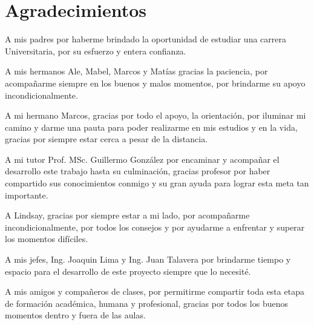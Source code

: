 \newpage

\chapter*{\centering Agradecimientos}

A mis padres por haberme brindado la oportunidad de estudiar una carrera Universitaria, por su esfuerzo y entera confianza.

A mis hermanos Ale, Mabel, Marcos y Matías gracias la paciencia, por acompañarme siempre en los buenos y malos momentos, por brindarme su apoyo incondicionalmente.

A mi hermano Marcos, gracias por todo el apoyo, la orientación, por iluminar mi camino y darme una pauta para poder realizarme en mis estudios y en la vida, gracias por siempre estar cerca a pesar de la distancia.

A mi tutor Prof. MSc. Guillermo González por encaminar y acompañar el desarrollo este trabajo hasta su culminación, gracias profesor por haber compartido sus conocimientos conmigo y su gran ayuda para lograr esta meta tan importante.

A Lindsay, gracias por siempre estar a mi lado, por acompañarme incondicionalmente, por todos los consejos y por ayudarme a enfrentar y superar los momentos difíciles.

A mis jefes, Ing. Joaquin Lima y Ing. Juan Talavera por brindarme tiempo y espacio para el desarrollo de este proyecto siempre que lo necesité.

A mis amigos y compañeros de clases, por permitirme compartir toda esta etapa de formación académica, humana y profesional, gracias por todos los buenos momentos dentro y fuera de las aulas.


